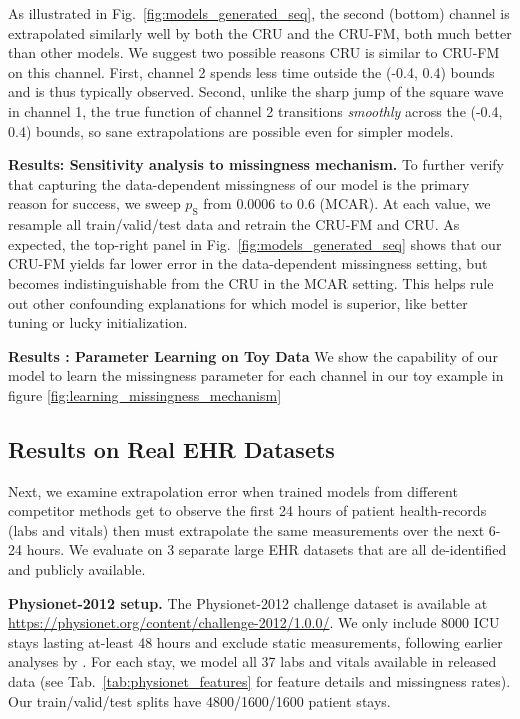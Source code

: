 As illustrated in Fig.~\ref{fig:models_generated_seq}, 
the second (bottom) channel is extrapolated similarly well by both the CRU and the CRU-FM, both much better than other models.
We suggest two possible reasons CRU is similar to CRU-FM on this channel.
First, channel 2 spends less time outside the (-0.4, 0.4) bounds and is thus typically observed.
Second, unlike the sharp jump of the square wave in channel 1, the true function of channel 2 transitions \textit{smoothly} across the (-0.4, 0.4) bounds, so sane extrapolations are possible even for simpler models.

\textbf{Results: Sensitivity analysis to missingness mechanism.}
To further verify that capturing the data-dependent missingness of our model is the primary reason for success,
we sweep $p_{\text{S}}$ from 0.0006 to 0.6 (MCAR). At each value,
we resample all train/valid/test data and retrain the CRU-FM and CRU. As expected, the top-right panel in Fig.~\ref{fig:models_generated_seq} shows that our CRU-FM yields far lower error in the data-dependent missingness setting, but becomes indistinguishable from the CRU in the MCAR setting. This helps rule out other confounding explanations for which model is superior, like better tuning or lucky initialization.


\textbf{Results : Parameter Learning on Toy Data}
We show the capability of our model to learn the missingness parameter for each channel in our toy example in figure \ref{fig:learning_missingness_mechanism}



\subsection{Results on Real EHR Datasets}
Next, we examine extrapolation error when trained models from different competitor methods get to observe the first 24 hours of patient health-records (labs and vitals) then must extrapolate the same measurements over the next 6-24 hours. We evaluate on 3 separate large EHR datasets that are all de-identified and publicly available.

\textbf{Physionet-2012 setup.} 
The Physionet-2012 challenge dataset \citep{silva2012predicting} is available at \href{https://physionet.org/content/challenge-2012/1.0.0/.}{https://physionet.org/content/challenge-2012/1.0.0/}. 
We only include 8000 ICU stays lasting at-least 48 hours and exclude static measurements, following earlier analyses by \citet{rubanova2019latent}.
For each stay, we model all 37 labs and vitals available in released data (see Tab.~\ref{tab:physionet_features} for feature details and missingness rates).
Our train/valid/test splits have 4800/1600/1600 patient stays.



